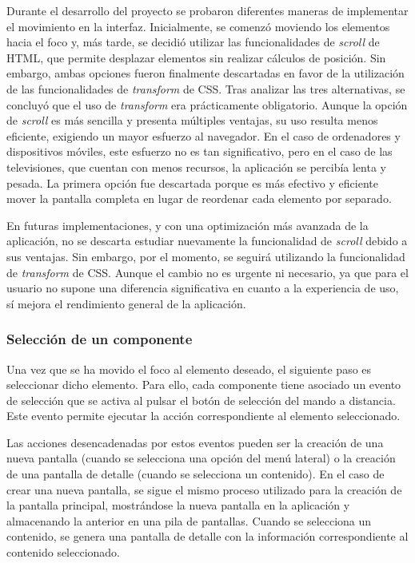 Durante el desarrollo del proyecto se probaron diferentes maneras de implementar el movimiento en la interfaz. Inicialmente, 
se comenzó moviendo los elementos hacia el foco y, más tarde, se decidió utilizar las funcionalidades de \textit{scroll} de HTML, 
que permite desplazar elementos sin realizar cálculos de posición. Sin embargo, ambas opciones fueron finalmente descartadas 
en favor de la utilización de las funcionalidades de \textit{transform} de CSS. Tras analizar las tres alternativas, 
se concluyó que el uso de \textit{transform} era prácticamente obligatorio. Aunque la opción de \textit{scroll} es más sencilla 
y presenta múltiples ventajas, su uso resulta menos eficiente, exigiendo un mayor esfuerzo al navegador. En el caso de 
ordenadores y dispositivos móviles, este esfuerzo no es tan significativo, pero en el caso de las televisiones, 
que cuentan con menos recursos, la aplicación se percibía lenta y pesada. La primera opción fue descartada porque es 
más efectivo y eficiente mover la pantalla completa en lugar de reordenar cada elemento por separado.

En futuras implementaciones, y con una optimización más avanzada de la aplicación, no se descarta estudiar nuevamente 
la funcionalidad de \textit{scroll} debido a sus ventajas. Sin embargo, por el momento, se seguirá utilizando la funcionalidad 
de \textit{transform} de CSS. Aunque el cambio no es urgente ni necesario, ya que para el usuario no supone una diferencia 
significativa en cuanto a la experiencia de uso, sí mejora el rendimiento general de la aplicación.

\subsubsection{Selección de un componente}
\label{sec:seleccion_componente}

Una vez que se ha movido el foco al elemento deseado, el siguiente paso es seleccionar dicho elemento. 
Para ello, cada componente tiene asociado un evento de selección que se activa al pulsar el botón de selección 
del mando a distancia. Este evento permite ejecutar la acción correspondiente al elemento seleccionado.

Las acciones desencadenadas por estos eventos pueden ser la creación de una nueva pantalla (cuando se selecciona 
una opción del menú lateral) o la creación de una pantalla de detalle (cuando se selecciona un contenido). 
En el caso de crear una nueva pantalla, se sigue el mismo proceso utilizado para la creación de la pantalla principal, 
mostrándose la nueva pantalla en la aplicación y almacenando la anterior en una pila de pantallas. 
Cuando se selecciona un contenido, se genera una pantalla de detalle con la información correspondiente 
al contenido seleccionado.


